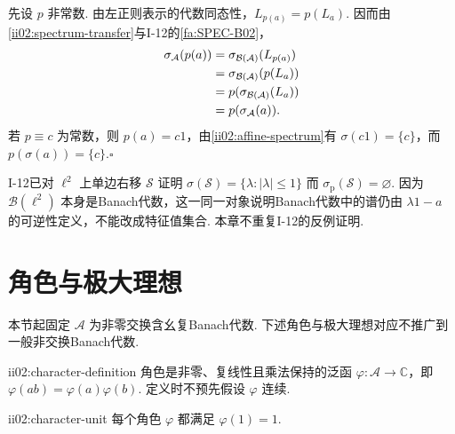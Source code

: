 \begin{FAProof}
先设 \(\displaystyle p\) 非常数. 由左正则表示的代数同态性，\(\displaystyle L_{p(a)}=p(L_a)\). 因而由\autoref{ii02:spectrum-transfer}与I-12的\autoref{fa:SPEC-B02}，
\[
\begin{aligned}
\displaystyle \sigma_{\mathcal A}(p(a)) &\displaystyle =\sigma_{\mathcal B(\mathcal A)}(L_{p(a)})\\
\displaystyle &\displaystyle =\sigma_{\mathcal B(\mathcal A)}(p(L_a))\\
\displaystyle &\displaystyle =p(\sigma_{\mathcal B(\mathcal A)}(L_a))\\
\displaystyle &\displaystyle =p(\sigma_{\mathcal A}(a)).
\end{aligned}
\]
若 \(\displaystyle p\equiv c\) 为常数，则 \(\displaystyle p(a)=c1\)，由\autoref{ii02:affine-spectrum}有 \(\displaystyle\sigma(c1)=\{c\}\)，而 \(\displaystyle p(\sigma(a))=\{c\}\).\hfill\(\square\)
\end{FAProof}

\begin{FACounterexample}[Banach代数谱仍不等于特征值集合]\label{ii02:ce-spectrum-noeig-reuse}
I-12已对 \(\displaystyle\ell^2\) 上单边右移 \(\displaystyle\mathcal S\) 证明 \(\displaystyle\sigma(\mathcal S)=\{\lambda:|\lambda|\leqslant1\}\) 而 \(\displaystyle\sigma_{\mathrm p}(\mathcal S)=\varnothing\). 因为 \(\displaystyle\mathcal B(\ell^2)\) 本身是Banach代数，这一同一对象说明Banach代数中的谱仍由 \(\displaystyle\lambda1-a\) 的可逆性定义，不能改成特征值集合. 本章不重复I-12的反例证明.
\end{FACounterexample}

\section{角色与极大理想}\label{sec:ii02-characters-maximal-ideals}

本节起固定 \(\displaystyle \mathcal A\) 为非零交换含幺复Banach代数. 下述角色与极大理想对应不推广到一般非交换Banach代数.

\begin{FADefinition}[B][角色]{ii02:character-definition}
角色是非零、复线性且乘法保持的泛函 \(\displaystyle\varphi:\mathcal A\to\mathbb C\)，即 \(\displaystyle\varphi(ab)=\varphi(a)\varphi(b)\). 定义时不预先假设 \(\displaystyle\varphi\) 连续.
\end{FADefinition}

\begin{FALemma}[B][角色在单位元上的取值]{ii02:character-unit}
每个角色 \(\displaystyle\varphi\) 都满足 \(\displaystyle\varphi(1)=1\).
\end{FALemma}


